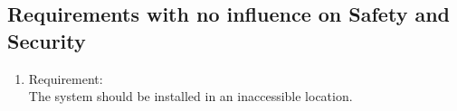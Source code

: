 \subsection{Requirements with no influence on Safety and Security}
    \begin{enumerate}[label*=\arabic*.]
        \item \label{qreq.1}  Requirement:  \\
        The system should be installed in an inaccessible location. \\ 
    \end{enumerate} 